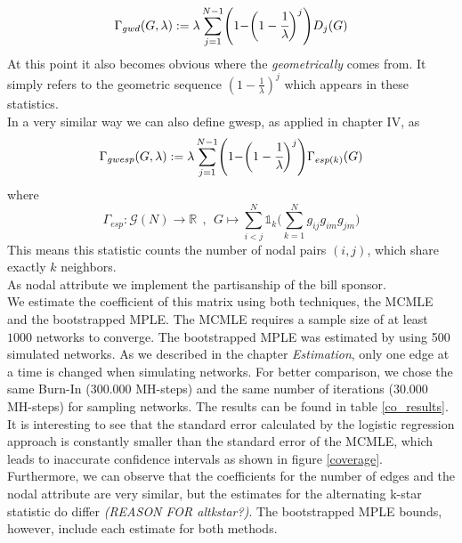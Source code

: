 \documentclass[10pt, conference, compsocconf]{IEEEtran}
\begin{document}
\begin{equation}
\Gamma_{gwd}(G,\lambda):= \lambda\sum_{j=1}^{N-1}\Biggr(1- \biggr(1-\cfrac{1}{\lambda}\biggl)^j\Biggl)D_j(G)
\end{equation}
At this point it also becomes obvious where the \textit{geometrically} comes from. It simply refers to the geometric sequence $(1-\frac{1}{\lambda})^j$ which appears in these statistics.\\[0.3cm]
In a very similar way we can also define gwesp, as applied in chapter IV, as
$$\Gamma_{gwesp}(G,\lambda):= \lambda\sum_{j=1}^{N-1}\Biggr(1- \biggr(1-\cfrac{1}{\lambda}\biggl)^j\Biggl)\Gamma_{esp(k)}(G)$$
where 
$$
\Gamma_{esp}: \mathcal{G}(N) \to \mathbb{R}~~,~~G \mapsto \sum_{i<j}^{N}\mathds{1}_k\biggl(\sum_{k=1}^N g_{ij}g_{im}g_{jm}\biggr)
$$
This means this statistic counts the number of nodal pairs $(i,j)$, which share exactly $k$ neighbors.\\
\noindent As nodal attribute we implement the partisanship of the bill sponsor.\\
We estimate the coefficient of this matrix using both techniques, the MCMLE and the bootstrapped MPLE. The MCMLE requires a sample size of at least $1000$ networks to converge. The bootstrapped MPLE was estimated by using 500 simulated networks. As we described in the chapter {\it Estimation}, only one edge at a time is changed when simulating networks. For better comparison, we chose the same Burn-In ($300.000$ MH-steps) and the same number of iterations ($30.000$ MH-steps) for sampling networks. The results can be found in table \ref{co_results}.\\
It is interesting to see that the standard error calculated by the logistic regression approach is constantly smaller than the standard error of the MCMLE, which leads to inaccurate confidence intervals as shown in figure \ref{coverage}. Furthermore, we can observe that the coefficients for the number of edges and the nodal attribute are very similar, but the estimates for the alternating k-star statistic do differ \textit{(REASON FOR altkstar?)}. The bootstrapped MPLE bounds, however, include each estimate for both methods.  \\
\end{document}
